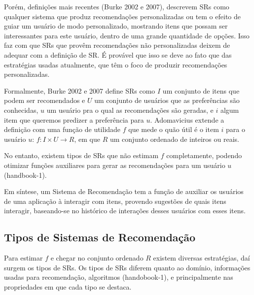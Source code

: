 \documentclass[normaltoc, espacoumemeio, pnumromarab,ruledheader]{abnt}
\begin{document}
Porém, definições mais recentes (Burke 2002 e 2007), descrevem SRs como qualquer sistema que produz recomendações personalizadas ou tem o efeito de guiar um usuário de modo personalizado, mostrando itens que possam ser interessantes para este usuário, dentro de uma grande quantidade de opções.
Isso faz com que SRs que provêm recomendações não personalizadas deixem de adequar com a definição de SR.
É provável que isso se deve ao fato que das estratégias usadas atualmente, que têm o foco de produzir recomendações personalizadas.

Formalmente, Burke 2002 e 2007 define SRs como $I$ um conjunto de itens que podem ser recomendados e $U$ um conjunto de usuários que as preferências são conhecidas, $u$ um usuário pra o qual as recomendações são geradas, e $i$ algum item que queremos predizer a preferência para $u$.
Adomavicius extende a definição com uma função de utilidade $f$ que mede o quão útil é o item $i$ para o usuário $u$: $f: I \times U \rightarrow R$, em que $R$ um conjunto ordenado de inteiros ou reais.

No entanto, existem tipos de SRs que não estimam $f$ completamente, podendo otimizar funções auxiliares para gerar as recomendações para um usuário $u$ (handbook-1).

Em síntese, um Sistema de Recomendação tem a função de auxiliar os usuários de uma aplicação à interagir com itens, provendo sugestões de quais itens interagir, baseando-se no histórico de interações desses usuários com esses itens.



 \subsection{Tipos de Sistemas de Recomendação}
 \label{sec:tipos}

Para estimar $f$ e chegar no conjunto ordenado $R$ existem diversas estratégias, daí surgem os tipos de SRs.
Os tipos de SRs diferem quanto ao domínio, informações usadas para recomendação, algoritmos (handobook-1), e principalmente nas propriedades em que cada tipo se destaca.
\end{document}
